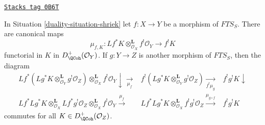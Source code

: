 \begin{lemma}
\label{duality-lemma-map-pullback-to-shriek-well-defined}
\href{https://stacks.math.columbia.edu/tag/0B6T}{\texttt{Stacks tag 0B6T}}

In Situation \ref{duality-situation-shriek} let
$f : X \to Y$ be a morphism of $\textit{FTS}_S$. There are canonical maps
$$
\mu_{f, K} :
Lf^*K \otimes_{\mathcal{O}_X}^\mathbf{L} f^!\mathcal{O}_Y
\longrightarrow
f^!K
$$
functorial in $K$ in $D^+_\QCoh(\mathcal{O}_Y)$.
If $g : Y \to Z$ is another morphism of $\textit{FTS}_S$, then
the diagram
$$
\begin{array}{ccc}Lf^*(Lg^*K \otimes_{\mathcal{O}_Y}^\mathbf{L} g^!\mathcal{O}_Z)
\otimes_{\mathcal{O}_X}^\mathbf{L} f^!\mathcal{O}_Y
\downarrow\underset{\mu_f}{\longrightarrow} & f^!(Lg^*K \otimes_{\mathcal{O}_Y}^\mathbf{L} g^!\mathcal{O}_Z)
\underset{f^!\mu_g}{\longrightarrow} & f^!g^!K \downarrow \\ Lf^*Lg^*K \otimes_{\mathcal{O}_X}^\mathbf{L} Lf^* g^!\mathcal{O}_Z
\otimes_{\mathcal{O}_X}^\mathbf{L} f^!\mathcal{O}_Y \overset{\mu_f}{\longrightarrow} & Lf^*Lg^*K \otimes_{\mathcal{O}_X}^\mathbf{L} f^!g^!\mathcal{O}_Z
\overset{\mu_{g \circ f}}{\longrightarrow} & f^!g^!K\end{array}
$$
commutes for all $K \in D^+_\QCoh(\mathcal{O}_Z)$.
\end{lemma}

